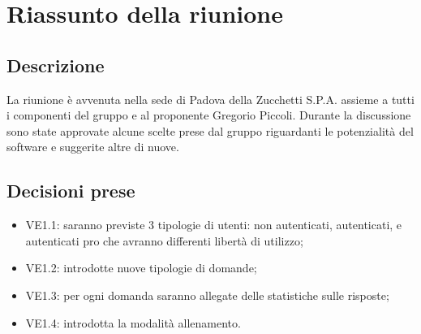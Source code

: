 \section{Riassunto della riunione}
\subsection{Descrizione}
La riunione è avvenuta nella sede di Padova della Zucchetti S.P.A. assieme a tutti i componenti del gruppo e al proponente Gregorio Piccoli. Durante la discussione sono state approvate alcune scelte prese dal gruppo riguardanti le potenzialità del software e suggerite altre di nuove.
\subsection{Decisioni prese}
\begin{itemize}
\item VE1.1: saranno previste 3 tipologie di utenti: non autenticati, autenticati, e autenticati pro che avranno differenti libertà di utilizzo;
\item VE1.2: introdotte nuove tipologie di domande;
\item VE1.3: per ogni domanda saranno allegate delle statistiche sulle risposte;
\item VE1.4: introdotta la modalità allenamento.
\end{itemize}
